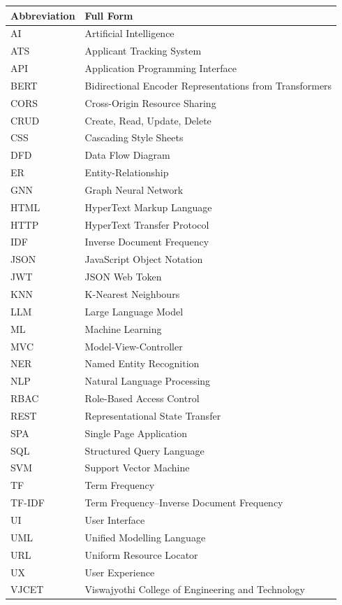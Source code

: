 \documentclass[12pt,a4paper]{report}
\begin{document}
\begin{tabular}{p{} p{}}
    \toprule
    \textbf{Abbreviation} & \textbf{Full Form} \\
    \midrule
    AI    & Artificial Intelligence \\
    ATS   & Applicant Tracking System \\
    API   & Application Programming Interface \\
    BERT  & Bidirectional Encoder Representations from Transformers \\
    CORS  & Cross-Origin Resource Sharing \\
    CRUD  & Create, Read, Update, Delete \\
    CSS   & Cascading Style Sheets \\
    DFD   & Data Flow Diagram \\
    ER    & Entity-Relationship \\
    GNN   & Graph Neural Network \\
    HTML  & HyperText Markup Language \\
    HTTP  & HyperText Transfer Protocol \\
    IDF   & Inverse Document Frequency \\
    JSON  & JavaScript Object Notation \\
    JWT   & JSON Web Token \\
    KNN   & K-Nearest Neighbours \\
    LLM   & Large Language Model \\
    ML    & Machine Learning \\
    MVC   & Model-View-Controller \\
    NER   & Named Entity Recognition \\
    NLP   & Natural Language Processing \\
    RBAC  & Role-Based Access Control \\
    REST  & Representational State Transfer \\
    SPA   & Single Page Application \\
    SQL   & Structured Query Language \\
    SVM   & Support Vector Machine \\
    TF    & Term Frequency \\
    TF-IDF & Term Frequency--Inverse Document Frequency \\
    UI    & User Interface \\
    UML   & Unified Modelling Language \\
    URL   & Uniform Resource Locator \\
    UX    & User Experience \\
    VJCET & Viswajyothi College of Engineering and Technology \\
    \bottomrule
\end{tabular}
\clearpage
\end{document}
